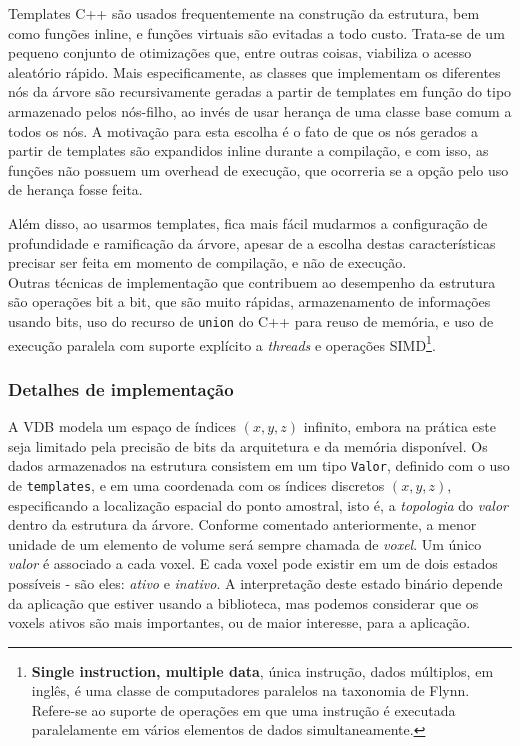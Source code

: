 Templates C++ são usados frequentemente na construção da estrutura, bem como funções inline, e funções virtuais são evitadas a todo custo. Trata-se de um pequeno conjunto de otimizações que, entre outras coisas, viabiliza o acesso aleatório rápido. Mais especificamente, as classes que implementam os diferentes nós da árvore são recursivamente geradas a partir de templates em função do tipo armazenado pelos nós-filho, ao invés de usar herança de uma classe base comum a todos os nós. A motivação para esta escolha é o fato de que os nós gerados a partir de templates são expandidos inline durante a compilação, e com isso, as funções não possuem um overhead de execução, que ocorreria se a opção pelo uso de herança fosse feita.

Além disso, ao usarmos templates, fica mais fácil mudarmos a configuração de profundidade e ramificação da árvore, apesar de a escolha destas características precisar ser feita em momento de compilação, e não de execução. \\

Outras técnicas de implementação que contribuem ao desempenho da estrutura são operações bit a bit, que são muito rápidas, armazenamento de informações usando bits, uso do recurso de \texttt{union} do C++ para reuso de memória, e uso de execução paralela com suporte explícito a {\it threads} e operações SIMD\footnote{{\bf Single instruction, multiple data}, única instrução, dados múltiplos, em inglês, é uma classe de computadores paralelos na taxonomia de Flynn. Refere-se ao suporte de operações em que uma instrução é executada paralelamente em vários elementos de dados simultaneamente.}.

\subsubsection{Detalhes de implementação}
A VDB modela um espaço de índices $(x, y, z)$ infinito, embora na prática este seja limitado pela precisão de bits da arquitetura e da memória disponível. Os dados armazenados na estrutura consistem em um tipo \texttt{Valor}, definido com o uso de \texttt{templates}, e em uma coordenada com os índices discretos $(x, y, z)$, especificando a localização espacial do ponto amostral, isto é, a {\it topologia} do {\it valor} dentro da estrutura da árvore. Conforme comentado anteriormente, a menor unidade de um elemento de volume será sempre chamada de {\it voxel}. Um único {\it valor} é associado a cada voxel. E cada voxel pode existir em um de dois estados possíveis - são eles: {\it ativo} e {\it inativo}. A interpretação deste estado binário depende da aplicação que estiver usando a biblioteca, mas podemos considerar que os voxels ativos são mais importantes, ou de maior interesse, para a aplicação. \\

